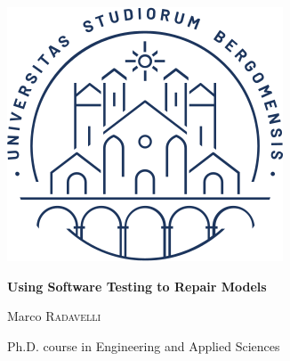 \documentclass [a4paper, 12pt, twoside]{report}
\def \ttitle {Using Software Testing to Repair Models} %
\def \authorname{Marco \textsc{Radavelli}} %
\newcommand{\citlab}{\textsc{CitLab}\xspace}
\theoremstyle{plain}
\theoremstyle{definition}
\theoremstyle{remark}
\theoremstyle{plain}
\theoremstyle{plain}
\theoremstyle{remark}
\begin{document}
%




\begin{titlepage}
  \begin{center}
    \includegraphics[scale=0.5]{images/sigillo.png}
    
    \vspace{1cm}
    
    
    \vspace{1cm}
    
	{\huge \bfseries \ttitle\par}\vspace{0.4cm} %
	
    \vspace{1.5cm}
    
    {\huge \authorname}
    
    \vspace{.2cm}
    
    {\large Ph.D. course in Engineering and Applied Sciences}


\end{center}
\end{titlepage}
\end{document}
